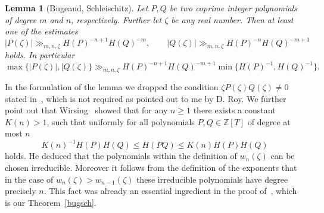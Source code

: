 \documentclass[12pt]{amsart}
\newtheorem{lemma}[theorem]{Lemma}
\theoremstyle{definition}
\begin{document}
\begin{lemma}[Bugeaud, Schleischitz] \label{kastner}
Let $P, Q$ be two coprime integer polynomials of degree $m$ and $n$, respectively. 
Further let $\zeta$ be any real number. Then
at least one of the estimates
\[
\vert P(\zeta)\vert \gg_{m,n,\zeta} H(P)^{-n+1} H(Q)^{-m}, \qquad \vert Q(\zeta)\vert\gg_{m,n,\zeta} H(P)^{-n} H(Q)^{-m+1}
\]
holds. In particular
\[
\max \{ \vert P(\zeta)\vert, \vert Q(\zeta)\} \gg_{m,n,\zeta} H(P)^{-n+1} H(Q)^{-m+1} \min \{ H(P)^{-1},H(Q)^{-1}\}.
\]
\end{lemma}

In the formulation of the lemma we dropped the 
condition $\zeta P(\zeta)Q(\zeta)\neq 0$ stated in~\cite{buschl},
which is not required as pointed out to me by D. Roy. 
We further point out that Wirsing~\cite{wirsing} showed that for any $n\geq 1$
there exists a constant $K(n)>1$, such that uniformly for all polynomials $P,Q\in\mathbb{Z}[T]$ 
of degree at most $n$
\begin{equation} \label{eq:wiersing}
K(n)^{-1}H(P)H(Q) \leq H(PQ) \leq K(n)H(P)H(Q) 
\end{equation}
holds. He deduced that the polynomials within the definition of $w_{n}(\zeta)$ can be chosen irreducible.
Moreover it follows from the definition of the exponents that in the case of $w_{n}(\zeta)>w_{n-1}(\zeta)$
these irreducible polynomials have degree precisely $n$. This fact was already an essential ingredient in 
the proof of~\cite[Theorem~2.1]{buschl}, which is 
our Theorem~\ref{bugsch}.
\end{document}
